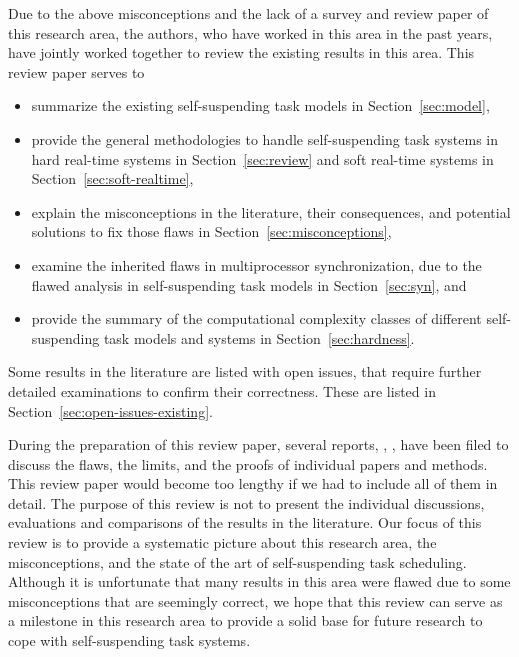 \noindent Due to the above misconceptions and the lack of a survey and review paper of this research area, the authors, who have worked in this area in the past years, have jointly worked together to review the existing results in this area. This review paper serves to
\begin{itemize}
\item summarize the existing self-suspending task models in Section~\ref{sec:model}, 
\item provide the general methodologies to handle self-suspending task systems in hard real-time systems in Section~\ref{sec:review} and soft real-time systems in Section~\ref{sec:soft-realtime}, 
\item explain the misconceptions in the literature, their consequences, and potential solutions to fix those flaws in Section~\ref{sec:misconceptions}, 
\item examine the inherited flaws in multiprocessor synchronization, due to the flawed analysis in self-suspending task models in Section~\ref{sec:syn}, and
\item provide the summary of the computational complexity classes of different self-suspending task models and systems in Section~\ref{sec:hardness}.
\end{itemize}
Some results in the literature are listed with open issues, that require further detailed examinations to confirm their correctness. These are listed in Section~\ref{sec:open-issues-existing}. 

During the preparation of this review paper, several reports, \ie, \cite{ChenHuangNelissen,ChenBrandenburg,erratu-cong-anderson,BletsasReport2015}, have been filed to discuss the flaws, the limits, and the proofs of individual papers and methods. This review paper would become too lengthy if we had to include all of them in detail.  The purpose of this review is not to present the individual discussions, evaluations and comparisons of the results in the literature. Our focus of this review is to provide a systematic picture about this research area, the misconceptions, and the state of the art of self-suspending task scheduling. Although it is unfortunate that many results in this area were flawed due to some misconceptions that are seemingly correct, we hope that this review can serve as a milestone in this research area to provide a solid base for future research to cope with self-suspending task systems.









    
  

    
  
